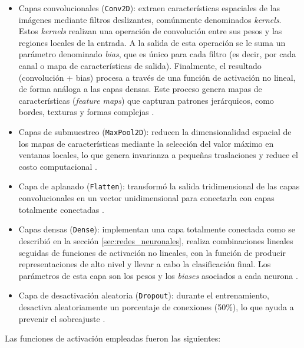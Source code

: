 \begin{itemize}
    \item Capas convolucionales (\texttt{Conv2D}): extraen características espaciales de las imágenes mediante filtros deslizantes, comúnmente denominados \textit{kernels}. Estos \textit{kernels} realizan una operación de convolución entre sus pesos y las regiones locales de la entrada. A la salida de esta operación se le suma un parámetro denominado \textit{bias}, que es único para cada filtro (es decir, por cada canal o mapa de características de salida). Finalmente, el resultado (convolución + bias) procesa a través de una función de activación no lineal, de forma análoga a las capas densas. Este proceso genera mapas de características (\textit{feature maps}) que capturan patrones jerárquicos, como bordes, texturas y formas complejas \cite{Krizhevsky2012}.

    \item Capas de submuestreo (\texttt{MaxPool2D}): reducen la dimensionalidad espacial de los mapas de características mediante la selección del valor máximo en ventanas locales, lo que genera invarianza a pequeñas traslaciones y reduce el costo computacional \cite{lecun1998gradient}.

    \item Capa de aplanado (\texttt{Flatten}): transformó la salida tridimensional de las capas convolucionales en un vector unidimensional para conectarla con capas totalmente conectadas \cite{Goodfellow2016}.

    \item Capas densas (\texttt{Dense}): implementan una capa totalmente conectada como se describió en la sección \ref{sec:redes_neuronales}, realiza combinaciones lineales seguidas de funciones de activación no lineales, con la función de producir representaciones de alto nivel y llevar a cabo la clasificación final. Los parámetros de esta capa son los pesos y los \textit{biases} asociados a cada neurona \cite{Goodfellow2016}.

    \item Capa de desactivación aleatoria (\texttt{Dropout}): durante el entrenamiento, desactiva aleatoriamente un porcentaje de conexiones (50\%), lo que ayuda a prevenir el sobreajuste \cite{Srivastava2014}.
\end{itemize}

Las funciones de activación empleadas fueron las siguientes:

